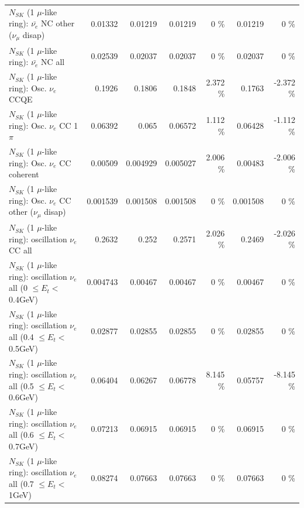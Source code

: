 \begin{table}
\begin{tabular}{| l | r | r | r  r | r  r |}
          $N_{SK}$ (1 $\mu$-like ring): $\bar{\nu_e}$ NC other ($\nu_\mu$ disap) &         0.01332 &         0.01219 &         0.01219 &        0 \%  &         0.01219 &        0 \%  \\ 
                            $N_{SK}$ (1 $\mu$-like ring): $\bar{\nu_{e}}$ NC all &         0.02539 &         0.02037 &         0.02037 &        0 \%  &         0.02037 &        0 \%  \\ 
\hline
\hline
\hline
                                 $N_{SK}$ (1 $\mu$-like ring): Osc. $\nu_e$ CCQE &          0.1926 &          0.1806 &          0.1848 &    2.372 \%  &          0.1763 &   -2.372 \%  \\ 
                            $N_{SK}$ (1 $\mu$-like ring): Osc. $\nu_e$ CC 1$\pi$ &         0.06392 &           0.065 &         0.06572 &    1.112 \%  &         0.06428 &   -1.112 \%  \\ 
                          $N_{SK}$ (1 $\mu$-like ring): Osc. $\nu_e$ CC coherent &         0.00509 &        0.004929 &        0.005027 &    2.006 \%  &         0.00483 &   -2.006 \%  \\ 
           $N_{SK}$ (1 $\mu$-like ring): Osc. $\nu_e$ CC other ($\nu_\mu$ disap) &        0.001539 &        0.001508 &        0.001508 &        0 \%  &        0.001508 &        0 \%  \\ 
                        $N_{SK}$ (1 $\mu$-like ring): oscillation $\nu_e$ CC all &          0.2632 &           0.252 &          0.2571 &    2.026 \%  &          0.2469 &   -2.026 \%  \\ 
\hline
$N_{SK}$ (1 $\mu$-like ring): oscillation $\nu_{e}$ all (0 $\leq E_{t} <$ 0.4GeV) &        0.004743 &         0.00467 &         0.00467 &        0 \%  &         0.00467 &        0 \%  \\ 
$N_{SK}$ (1 $\mu$-like ring): oscillation $\nu_{e}$ all (0.4 $\leq E_{t} <$ 0.5GeV) &         0.02877 &         0.02855 &         0.02855 &        0 \%  &         0.02855 &        0 \%  \\ 
$N_{SK}$ (1 $\mu$-like ring): oscillation $\nu_{e}$ all (0.5 $\leq E_{t} <$ 0.6GeV) &         0.06404 &         0.06267 &         0.06778 &    8.145 \%  &         0.05757 &   -8.145 \%  \\ 
$N_{SK}$ (1 $\mu$-like ring): oscillation $\nu_{e}$ all (0.6 $\leq E_{t} <$ 0.7GeV) &         0.07213 &         0.06915 &         0.06915 &        0 \%  &         0.06915 &        0 \%  \\ 
$N_{SK}$ (1 $\mu$-like ring): oscillation $\nu_{e}$ all (0.7 $\leq E_{t} <$ 1GeV) &         0.08274 &         0.07663 &         0.07663 &        0 \%  &         0.07663 &        0 \%  \\ 

\end{tabular}
\end{table}
